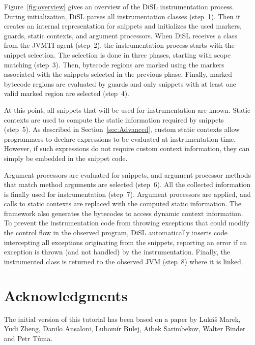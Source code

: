 \documentclass{article}
\begin{document}
Figure~\ref{fig:overview} gives an overview of the DiSL instrumentation process.
During initialization, DiSL parses all instrumentation classes (step~1).
Then it creates an internal representation for snippets and initializes the used markers, guards, static contexts, and argument processors.
When DiSL receives a class from the JVMTI agent (step~2), the instrumentation process starts with the snippet selection.
The selection is done in three phases, starting with scope matching (step~3).
Then, bytecode regions are marked using the markers associated with the snippets selected in the previous phase. %
Finally, marked bytecode regions are evaluated by guards and only snippets with at least one valid marked region are selected (step~4).

At this point, all snippets that will be used for instrumentation are known.
Static contexts are used to compute the static information required by snippets (step~5).
As described in Section~\ref{sec:Advanced}, custom static contexts allow programmers to declare expressions to be evaluated at instrumentation time.
However, if such expressions do not require custom context information, they can simply be embedded in the snippet code.

Argument processors are evaluated for snippets, and argument processor methods that match method arguments are selected (step~6).
All the collected information is finally used for instrumentation (step~7).
Argument processors are applied, and calls to static contexts are replaced with the computed static information.
The framework also generates the bytecodes to access dynamic context information.
To prevent the instrumentation code from throwing exceptions that could modify the control flow in the observed program, DiSL automatically inserts code intercepting all exceptions originating from the snippets, reporting an error if an exception is thrown (and not handled) by the instrumentation.
Finally, the instrumented class is returned to the observed JVM (step~8) where it is linked.

\section{Acknowledgments}\label{sec:Acks}

The initial version of this tutorial has been based on a paper by Lukáš Marek, Yudi Zheng, Danilo Ansaloni, Lubomír Bulej, Aibek Sarimbekov, Walter Binder and Petr Tůma.

\newpage
\appendix
\end{document}
